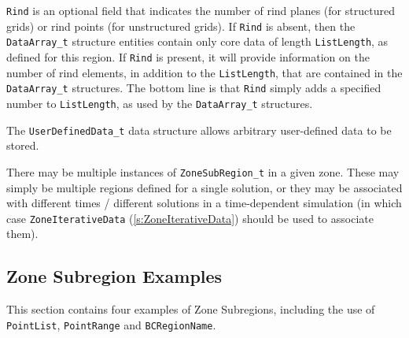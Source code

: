 \texttt{Rind} is an optional field that indicates the
number of rind planes (for structured grids) or rind points (for unstructured grids).
If \texttt{Rind} is absent, then the \texttt{DataArray\_t} structure entities contain
only core data of length \texttt{ListLength}, as defined for this region.
If \texttt{Rind} is present, it will provide information on the number of
rind elements, in addition to the \texttt{ListLength}, that are contained
in the \texttt{DataArray\_t} structures. The bottom line is that \texttt{Rind}
simply adds a specified number to \texttt{ListLength},
as used by the \texttt{DataArray\_t} structures.

The \texttt{UserDefinedData\_t} data structure
allows arbitrary user-defined data to be stored.

There may be multiple instances of \texttt{ZoneSubRegion\_t} in a given zone.
These may simply be multiple regions defined for a single solution,
or they may be associated with different times / different solutions in a
time-dependent simulation (in which case
\texttt{ZoneIterativeData} (\autoref{s:ZoneIterativeData}) should be
used to associate them).

\subsection{Zone Subregion Examples}
\label{s:zonesubregion_examples}

This section contains four examples of Zone Subregions, including
the use of \texttt{PointList}, \texttt{PointRange} and \texttt{BCRegionName}.

